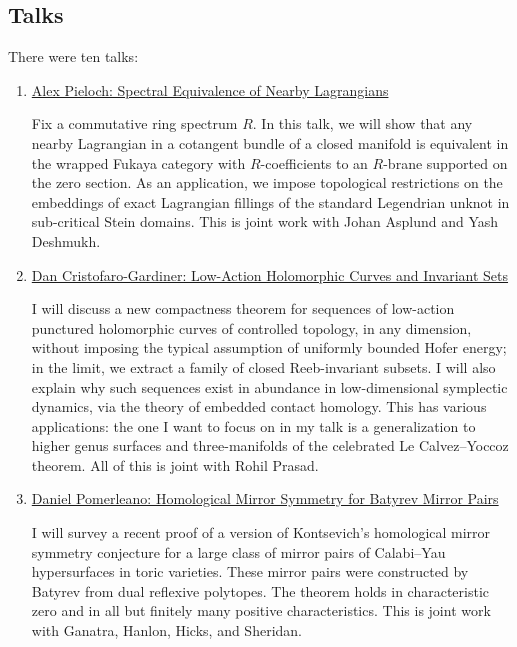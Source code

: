 % 
%
%

\begin{partbacktext}
\part{Talks}

There were ten talks:\\

\begin{enumerate}
    \item \href{#pieloch}{Alex Pieloch: Spectral Equivalence of Nearby Lagrangians}
    
    Fix a commutative ring spectrum $R$. In this talk, we will show that any nearby Lagrangian in a cotangent bundle of a closed manifold is equivalent in the wrapped Fukaya category with $R$-coefficients to an $R$-brane supported on the zero section. As an application, we impose topological restrictions on the embeddings of exact Lagrangian fillings of the standard Legendrian unknot in sub-critical Stein domains. This is joint work with Johan Asplund and Yash Deshmukh.

    \item \href{#cristofaro}{Dan Cristofaro-Gardiner: Low-Action Holomorphic Curves and Invariant Sets}
    
    I will discuss a new compactness theorem for sequences of low-action punctured holomorphic curves of controlled topology, in any dimension, without imposing the typical assumption of uniformly bounded Hofer energy; in the limit, we extract a family of closed Reeb-invariant subsets. I will also explain why such sequences exist in abundance in low-dimensional symplectic dynamics, via the theory of embedded contact homology. This has various applications: the one I want to focus on in my talk is a generalization to higher genus surfaces and three-manifolds of the celebrated Le Calvez–Yoccoz theorem. All of this is joint with Rohil Prasad.

    \item \href{#pomerleano}{Daniel Pomerleano: Homological Mirror Symmetry for Batyrev Mirror Pairs}
    
    I will survey a recent proof of a version of Kontsevich’s homological mirror symmetry conjecture for a large class of mirror pairs of Calabi–Yau hypersurfaces in toric varieties. These mirror pairs were constructed by Batyrev from dual reflexive polytopes. The theorem holds in characteristic zero and in all but finitely many positive characteristics. This is joint work with Ganatra, Hanlon, Hicks, and Sheridan.


\end{enumerate}
\end{partbacktext}
